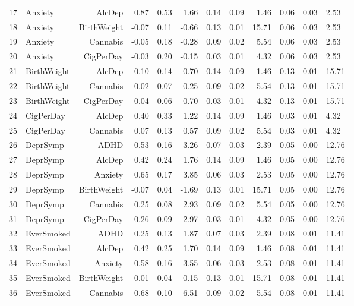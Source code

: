 \begin{longtable}{llrrrrrrrrr}
  17 & Anxiety & AlcDep & 0.87 & 0.53 & 1.66 & 0.14 & 0.09 & 1.46 & 0.06 & 0.03 & 2.53 \\ 
  18 & Anxiety & BirthWeight & -0.07 & 0.11 & -0.66 & 0.13 & 0.01 & 15.71 & 0.06 & 0.03 & 2.53 \\ 
  19 & Anxiety & Cannabis & -0.05 & 0.18 & -0.28 & 0.09 & 0.02 & 5.54 & 0.06 & 0.03 & 2.53 \\ 
  20 & Anxiety & CigPerDay & -0.03 & 0.20 & -0.15 & 0.03 & 0.01 & 4.32 & 0.06 & 0.03 & 2.53 \\ 
  21 & BirthWeight & AlcDep & 0.10 & 0.14 & 0.70 & 0.14 & 0.09 & 1.46 & 0.13 & 0.01 & 15.71 \\ 
  22 & BirthWeight & Cannabis & -0.02 & 0.07 & -0.25 & 0.09 & 0.02 & 5.54 & 0.13 & 0.01 & 15.71 \\ 
  23 & BirthWeight & CigPerDay & -0.04 & 0.06 & -0.70 & 0.03 & 0.01 & 4.32 & 0.13 & 0.01 & 15.71 \\ 
  24 & CigPerDay & AlcDep & 0.40 & 0.33 & 1.22 & 0.14 & 0.09 & 1.46 & 0.03 & 0.01 & 4.32 \\ 
  25 & CigPerDay & Cannabis & 0.07 & 0.13 & 0.57 & 0.09 & 0.02 & 5.54 & 0.03 & 0.01 & 4.32 \\ 
  26 & DeprSymp & ADHD & 0.53 & 0.16 & 3.26 & 0.07 & 0.03 & 2.39 & 0.05 & 0.00 & 12.76 \\ 
  27 & DeprSymp & AlcDep & 0.42 & 0.24 & 1.76 & 0.14 & 0.09 & 1.46 & 0.05 & 0.00 & 12.76 \\ 
  28 & DeprSymp & Anxiety & 0.65 & 0.17 & 3.85 & 0.06 & 0.03 & 2.53 & 0.05 & 0.00 & 12.76 \\ 
  29 & DeprSymp & BirthWeight & -0.07 & 0.04 & -1.69 & 0.13 & 0.01 & 15.71 & 0.05 & 0.00 & 12.76 \\ 
  30 & DeprSymp & Cannabis & 0.25 & 0.08 & 2.93 & 0.09 & 0.02 & 5.54 & 0.05 & 0.00 & 12.76 \\ 
  31 & DeprSymp & CigPerDay & 0.26 & 0.09 & 2.97 & 0.03 & 0.01 & 4.32 & 0.05 & 0.00 & 12.76 \\ 
  32 & EverSmoked & ADHD & 0.25 & 0.13 & 1.87 & 0.07 & 0.03 & 2.39 & 0.08 & 0.01 & 11.41 \\ 
  33 & EverSmoked & AlcDep & 0.42 & 0.25 & 1.70 & 0.14 & 0.09 & 1.46 & 0.08 & 0.01 & 11.41 \\ 
  34 & EverSmoked & Anxiety & 0.58 & 0.16 & 3.55 & 0.06 & 0.03 & 2.53 & 0.08 & 0.01 & 11.41 \\ 
  35 & EverSmoked & BirthWeight & 0.01 & 0.04 & 0.15 & 0.13 & 0.01 & 15.71 & 0.08 & 0.01 & 11.41 \\ 
  36 & EverSmoked & Cannabis & 0.68 & 0.10 & 6.51 & 0.09 & 0.02 & 5.54 & 0.08 & 0.01 & 11.41 \\ 

\end{longtable}
